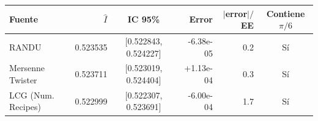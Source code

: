 \begin{tabular}{lrcrrc}
\toprule
Fuente & $\hat I$ & IC 95\% & Error & $|$error$|/$EE & Contiene $\pi/6$ \\
\midrule
RANDU & 0.523535 & [0.522843, 0.524227] & -6.38e-05 & 0.2 & Sí \\
Mersenne Twister & 0.523711 & [0.523019, 0.524404] & +1.13e-04 & 0.3 & Sí \\
LCG (Num. Recipes) & 0.522999 & [0.522307, 0.523691] & -6.00e-04 & 1.7 & Sí \\
\bottomrule
\end{tabular}

